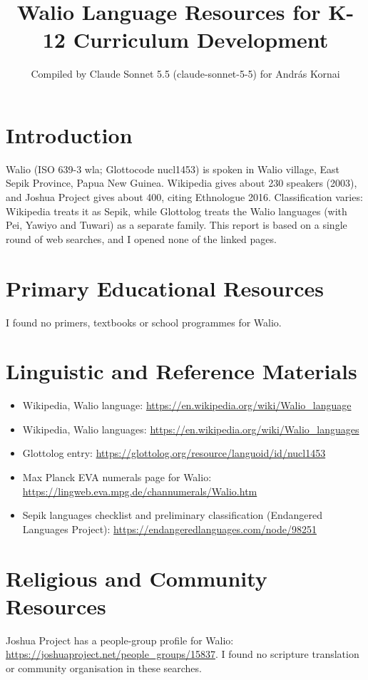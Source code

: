 \documentclass[12pt]{article}
\title{Walio Language Resources for K-12 Curriculum Development}
\author{Compiled by Claude Sonnet 5.5 (claude-sonnet-5-5) for Andr\'as Kornai}
\date{}
\begin{document}
\maketitle

\section{Introduction}
Walio (ISO 639-3 wla; Glottocode nucl1453) is spoken in Walio village, East Sepik Province, Papua New Guinea. Wikipedia gives about 230 speakers (2003), and Joshua Project gives about 400, citing Ethnologue 2016. Classification varies: Wikipedia treats it as Sepik, while Glottolog treats the Walio languages (with Pei, Yawiyo and Tuwari) as a separate family. This report is based on a single round of web searches, and I opened none of the linked pages.

\section{Primary Educational Resources}
I found no primers, textbooks or school programmes for Walio.

\section{Linguistic and Reference Materials}
\begin{itemize}
\item Wikipedia, Walio language: \url{https://en.wikipedia.org/wiki/Walio_language}
\item Wikipedia, Walio languages: \url{https://en.wikipedia.org/wiki/Walio_languages}
\item Glottolog entry: \url{https://glottolog.org/resource/languoid/id/nucl1453}
\item Max Planck EVA numerals page for Walio: \url{https://lingweb.eva.mpg.de/channumerals/Walio.htm}
\item Sepik languages checklist and preliminary classification (Endangered Languages Project): \url{https://endangeredlanguages.com/node/98251}
\end{itemize}

\section{Religious and Community Resources}
Joshua Project has a people-group profile for Walio: \url{https://joshuaproject.net/people_groups/15837}. I found no scripture translation or community organisation in these searches.
\end{document}
